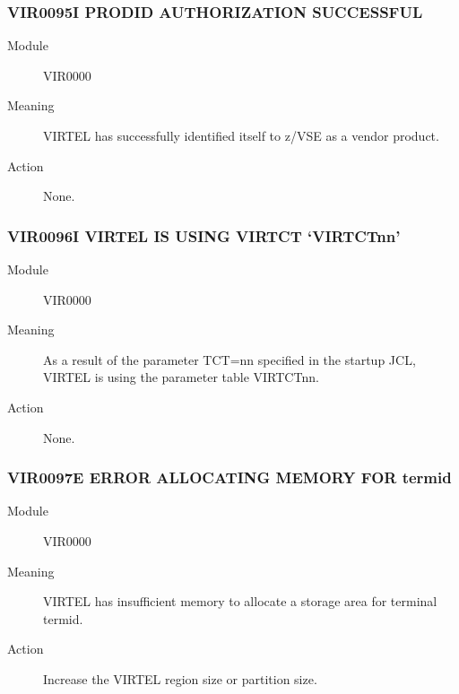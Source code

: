 \documentclass[letterpaper,10pt,english]{sphinxmanual}
\begin{document}
\subsubsection{VIR0095I PRODID AUTHORIZATION SUCCESSFUL}
\label{\detokenize{messages:vir0095i-prodid-authorization-successful}}\begin{description}
\item[{Module}] \leavevmode
VIR0000

\item[{Meaning}] \leavevmode
VIRTEL has successfully identified itself to z/VSE as a vendor product.

\item[{Action}] \leavevmode
None.

\end{description}


\subsubsection{VIR0096I VIRTEL IS USING VIRTCT ‘VIRTCTnn’}
\label{\detokenize{messages:vir0096i-virtel-is-using-virtct-virtctnn}}\begin{description}
\item[{Module}] \leavevmode
VIR0000

\item[{Meaning}] \leavevmode
As a result of the parameter TCT=nn specified in the startup JCL, VIRTEL is using the parameter table VIRTCTnn.

\item[{Action}] \leavevmode
None.

\end{description}


\subsubsection{VIR0097E ERROR ALLOCATING MEMORY FOR termid}
\label{\detokenize{messages:vir0097e-error-allocating-memory-for-termid}}\begin{description}
\item[{Module}] \leavevmode
VIR0000

\item[{Meaning}] \leavevmode
VIRTEL has insufficient memory to allocate a storage area for terminal termid.

\item[{Action}] \leavevmode
Increase the VIRTEL region size or partition size.

\end{description}
\end{document}
